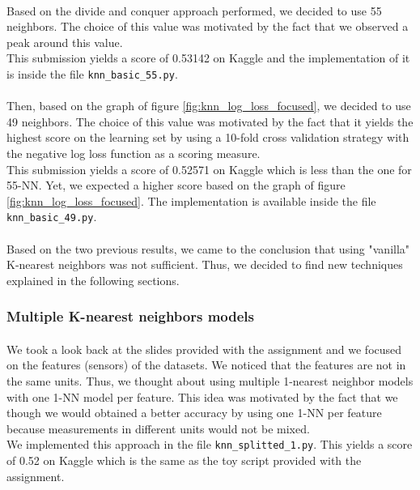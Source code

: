 \documentclass[a4paper, 11pt, oneside]{article}
\begin{document}
\paragraph{}Based on the divide and conquer approach performed, we decided to use 55 neighbors. The choice of this value was motivated by the fact that we observed a peak around this value.\\
This submission yields a score of 0.53142 on Kaggle and the implementation of it is inside the file \texttt{knn\_basic\_55.py}.
\paragraph{}Then, based on the graph of figure \ref{fig:knn_log_loss_focused}, we decided to use 49 neighbors. The choice of this value was motivated by the fact that it yields the highest score on the learning set by using a 10-fold cross validation strategy with the negative log loss function as a scoring measure.\\
This submission yields a score of 0.52571 on Kaggle which is less than the one for 55-NN. Yet, we expected a higher score based on the graph of figure \ref{fig:knn_log_loss_focused}. The implementation is available inside the file \texttt{knn\_basic\_49.py}.
\paragraph{}Based on the two previous results, we came to the conclusion that using "vanilla" K-nearest neighbors was not sufficient. Thus, we decided to find new techniques explained in the following sections.

\subsubsection{Multiple K-nearest neighbors models} \label{subsec:knnMultiple}
\paragraph{}We took a look back at the slides provided with the assignment and we focused on the features (sensors) of the datasets. We noticed that the features are not in the same units. Thus, we thought about using multiple 1-nearest neighbor models with one 1-NN model per feature. This idea was motivated by the fact that we though we would obtained a better accuracy by using one 1-NN per feature because measurements in different units would not be mixed.\\
We implemented this approach in the file \texttt{knn\_splitted\_1.py}. This yields a score of 0.52 on Kaggle which is the same as the toy script provided with the assignment.
\end{document}

